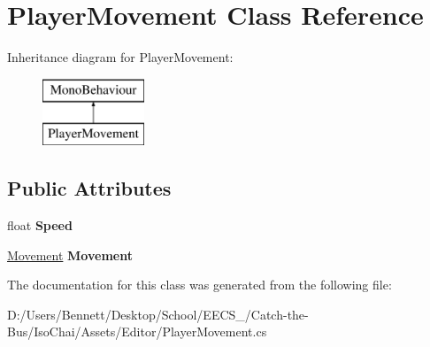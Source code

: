 \hypertarget{class_player_movement}{}\section{Player\+Movement Class Reference}
\label{class_player_movement}
Inheritance diagram for Player\+Movement\+:\begin{figure}[H]
\begin{center}
\leavevmode
\includegraphics[height=2.000000cm]{class_player_movement}
\end{center}
\end{figure}
\subsection*{Public Attributes}
\begin{DoxyCompactItemize}
\item 
\mbox{\label{class_player_movement_a309c9f0b99a9b1c026fbf82d7fc2509e}} 
float {\bfseries Speed}
\item 
\mbox{\label{class_player_movement_a5688ed1094d11c5f8c0c0fcd8a2bda20}} 
\mbox{\hyperlink{class_movement}{Movement}} {\bfseries Movement}
\end{DoxyCompactItemize}


The documentation for this class was generated from the following file\+:\begin{DoxyCompactItemize}
\item 
D\+:/\+Users/\+Bennett/\+Desktop/\+School/\+E\+E\+C\+S\+\_/\+Catch-\/the-\/\+Bus/\+Iso\+Chai/\+Assets/\+Editor/Player\+Movement.\+cs\end{DoxyCompactItemize}
